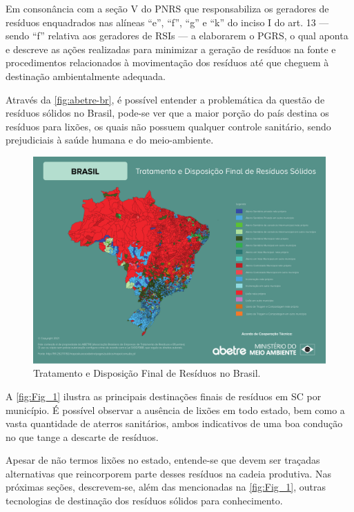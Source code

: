 Em consonância com a seção V do \gls{PNRS} que responsabiliza os geradores de resíduos enquadrados nas alíneas  “e”, “f”, “g” e “k” do inciso I do art. 13 — sendo “f” relativa aos geradores de \gls{RSI}s — a elaborarem o \gls{PGRS}, o qual aponta e descreve as ações realizadas para minimizar a geração de resíduos na fonte e procedimentos relacionados à movimentação dos resíduos até que cheguem à destinação ambientalmente adequada.

Através da \autoref{fig:abetre-br}, é possível entender a problemática da questão de resíduos sólidos no Brasil, pode-se ver que a maior porção do país destina os resíduos para lixões, os quais não possuem qualquer controle sanitário, sendo prejudiciais à saúde humana e do meio-ambiente.

\begin{figure}[h]
	\caption{\label{fig:abetre-br} Tratamento e Disposição Final de Resíduos no Brasil.}
	\begin{center}
		\includegraphics[scale=0.52]{images/abetre_brasil.pdf}
	\end{center}
\end{figure}

A \autoref{fig:Fig_1} ilustra as principais destinações finais de resíduos em \gls{SC} por município. É possível observar a ausência de lixões em todo estado, bem como a vasta quantidade de aterros sanitários, ambos indicativos de uma boa condução no que tange a descarte de resíduos.

Apesar de não termos lixões no estado, entende-se que devem ser traçadas alternativas que reincorporem parte desses resíduos na cadeia produtiva. Nas próximas seções, descrevem-se, além das mencionadas na \autoref{fig:Fig_1}, outras tecnologias de destinação dos resíduos sólidos para conhecimento.


